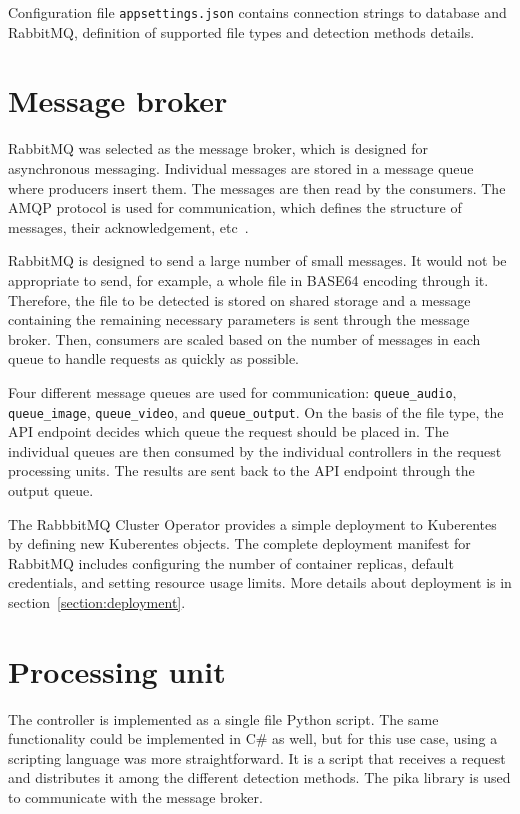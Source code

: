Configuration file \texttt{appsettings.json} contains connection strings to database and RabbitMQ, definition of supported file types and detection methods details.

\section{Message broker}

RabbitMQ was selected as the message broker, which is designed for asynchronous messaging. Individual messages are stored in a message queue where producers insert them. The messages are then read by the consumers. The AMQP protocol is used for communication, which defines the structure of messages, their acknowledgement, etc~\cite{AMQP}.

RabbitMQ is designed to send a large number of small messages. It would not be appropriate to send, for example, a whole file in BASE64 encoding through it. Therefore, the file to be detected is stored on shared storage and a message containing the remaining necessary parameters is sent through the message broker. Then, consumers are scaled based on the number of messages in each queue to handle requests as quickly as possible.

Four different message queues are used for communication: \texttt{queue\_audio}, \texttt{queue\_image}, \texttt{queue\_video}, and \texttt{queue\_output}. On the basis of the file type, the API endpoint decides which queue the request should be placed in. The individual queues are then consumed by the individual controllers in the request processing units. The results are sent back to the API endpoint through the output queue.

The RabbbitMQ Cluster Operator provides a simple deployment to Kuberentes by defining new Kuberentes objects. The complete deployment manifest for RabbitMQ includes configuring the number of container replicas, default credentials, and setting resource usage limits. More details about deployment is in section~\ref{section:deployment}.~\cite{RabbitMQOperator}

\section{Processing unit}

The controller is implemented as a single file Python script. The same functionality could be implemented in C\# as well, but for this use case, using a scripting language was more straightforward. It is a script that receives a request and distributes it among the different detection methods. The pika library is used to communicate with the message broker.

